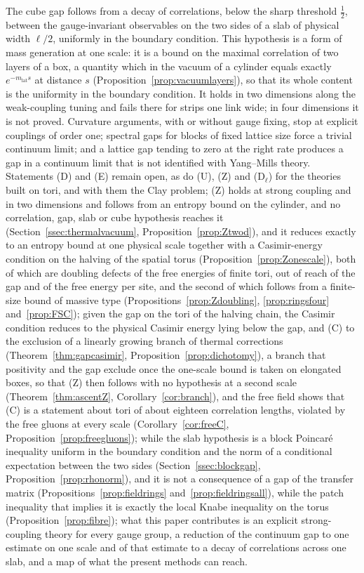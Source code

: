 The cube gap follows from a decay of correlations, below the sharp threshold
$\frac12$, between the gauge-invariant observables on the two sides of a slab
of physical width $\ell/2$, uniformly in the boundary condition. This
hypothesis is a form of mass generation at one scale: it is a bound on the
maximal correlation of two layers of a box, a quantity which in the vacuum
of a cylinder equals exactly $e^{-m_{\mathrm{lat}}s}$ at distance $s$
(Proposition~\ref{prop:vacuumlayers}), so that its whole content is the
uniformity in the boundary condition. It holds in two dimensions along the
weak-coupling tuning and fails there for strips one link wide; in four
dimensions it is not proved. Curvature arguments, with or
without gauge fixing, stop at explicit couplings of order one; spectral gaps
for blocks of fixed lattice size force a trivial continuum limit; and a
lattice gap tending to zero at the right rate produces a gap in a continuum
limit that is not identified with Yang--Mills theory. Statements (D) and (E)
remain open, as do (U), (Z) and (D$_\ell$) for the theories built on tori,
and with them the Clay problem; (Z) holds at strong coupling and in two
dimensions and follows from an entropy bound on the cylinder, and no
correlation, gap, slab or cube hypothesis reaches it
(Section~\ref{ssec:thermalvacuum}, Proposition~\ref{prop:Ztwod}), and it
reduces exactly to an entropy bound at one physical scale together with a
Casimir-energy condition on the halving of the spatial torus
(Proposition~\ref{prop:Zonescale}), both of which are doubling defects of
the free energies of finite tori, out of reach of the gap and of the free
energy per site, and the second of which follows from a finite-size bound
of massive type (Propositions~\ref{prop:Zdoubling}, \ref{prop:ringsfour}
and~\ref{prop:FSC}); given the gap on the tori of the halving chain, the
Casimir condition reduces to the physical Casimir energy lying below the
gap, and (C) to the exclusion of a linearly growing branch of thermal
corrections (Theorem~\ref{thm:gapcasimir}, Proposition~\ref{prop:dichotomy}),
a branch that positivity and the gap exclude once the one-scale bound is
taken on elongated boxes, so that (Z) then follows with no hypothesis at a
second scale (Theorem~\ref{thm:ascentZ}, Corollary~\ref{cor:branch}),
and the free field shows that (C) is a statement about tori of about eighteen
correlation lengths, violated by the free gluons at every scale
(Corollary~\ref{cor:freeC}, Proposition~\ref{prop:freegluons}); while the
slab hypothesis is a block Poincar\'e inequality uniform in the boundary
condition and the norm of a conditional expectation between the two sides
(Section~\ref{ssec:blockgap}, Proposition~\ref{prop:rhonorm}), and it is
not a consequence of a gap of the transfer matrix
(Propositions~\ref{prop:fieldrings} and~\ref{prop:fieldringsall}), while
the patch inequality that implies it is exactly the local Knabe inequality
on the torus (Proposition~\ref{prop:fibre}); what this paper contributes is an
explicit strong-coupling theory for every gauge group, a reduction of the
continuum gap to one estimate on one scale and of that estimate to a decay of
correlations across one slab, and a map of what the present methods can reach.
